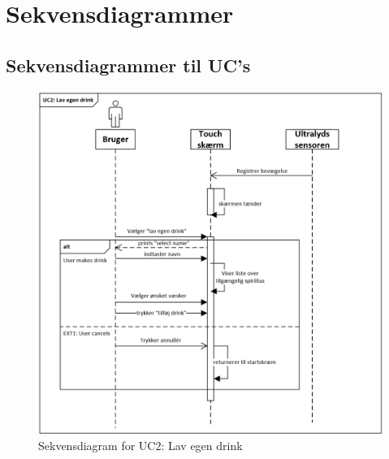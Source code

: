 \section{Sekvensdiagrammer}

\subsection{Sekvensdiagrammer til UC's}

\begin{figure}[H]
	\centering
	\includegraphics[width=1\textwidth]{Images/UC2lavegendrink.png}
	\caption{Sekvensdiagram for UC2: Lav egen drink}
	\label{fig:UC2}
\end{figure}

